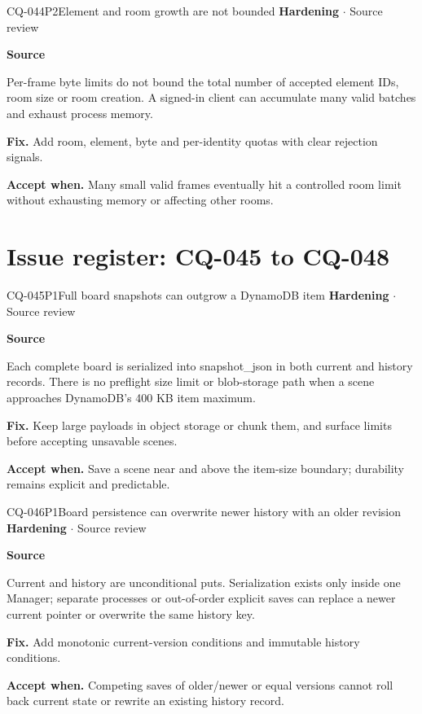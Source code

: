 \begin{finding}{CQ-044}{P2}{Element and room growth are not bounded}
\textbf{Hardening} $\cdot$ Source review\par
\textbf{Source}\quad{}\par
Per-frame byte limits do not bound the total number of accepted element IDs, room size or room creation. A signed-in client can accumulate many valid batches and exhaust process memory.\par
\textbf{Fix.} Add room, element, byte and per-identity quotas with clear rejection signals.\par
\textbf{Accept when.} Many small valid frames eventually hit a controlled room limit without exhausting memory or affecting other rooms.
\end{finding}
\clearpage
\section*{Issue register: CQ-045 to CQ-048}
\begin{finding}{CQ-045}{P1}{Full board snapshots can outgrow a DynamoDB item}
\textbf{Hardening} $\cdot$ Source review\par
\textbf{Source}\quad{}\par
Each complete board is serialized into snapshot\_json in both current and history records. There is no preflight size limit or blob-storage path when a scene approaches DynamoDB's 400 KB item maximum.\par
\textbf{Fix.} Keep large payloads in object storage or chunk them, and surface limits before accepting unsavable scenes.\par
\textbf{Accept when.} Save a scene near and above the item-size boundary; durability remains explicit and predictable.
\end{finding}
\begin{finding}{CQ-046}{P1}{Board persistence can overwrite newer history with an older revision}
\textbf{Hardening} $\cdot$ Source review\par
\textbf{Source}\quad{}\par
Current and history are unconditional puts. Serialization exists only inside one Manager; separate processes or out-of-order explicit saves can replace a newer current pointer or overwrite the same history key.\par
\textbf{Fix.} Add monotonic current-version conditions and immutable history conditions.\par
\textbf{Accept when.} Competing saves of older/newer or equal versions cannot roll back current state or rewrite an existing history record.
\end{finding}
